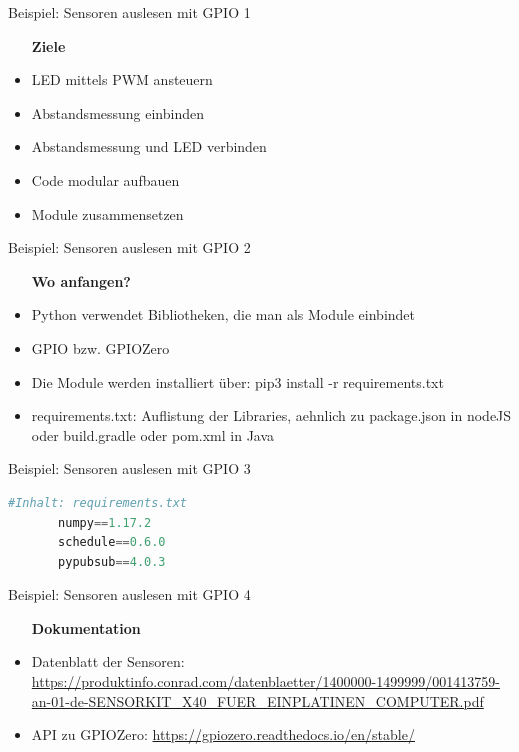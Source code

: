 \begin{frame}{Beispiel: Sensoren auslesen mit GPIO 1}
    \begin{itemize}
    \setlength{\itemindent}{.4in}
     \item [\textbf{ Ziele}]
    \end{itemize}
    \begin{itemize}
        \item  LED mittels PWM ansteuern
        \item  Abstandsmessung einbinden
        \item  Abstandsmessung und LED verbinden
        \item  Code modular aufbauen
        \item  Module zusammensetzen
     \end{itemize}
\end{frame}

\begin{frame}{Beispiel: Sensoren auslesen mit GPIO 2}
    \begin{itemize}
    \setlength{\itemindent}{1in}
     \item [\textbf{ Wo anfangen?}]
    \end{itemize}
    \begin{itemize}
        \item  Python verwendet Bibliotheken, die man als Module einbindet
        \item  GPIO bzw. GPIOZero
        \item  Die Module werden installiert über:  pip3 install -r requirements.txt
        \item  requirements.txt: Auflistung der Libraries, aehnlich zu package.json in nodeJS oder build.gradle oder pom.xml in Java
     \end{itemize}
\end{frame}

\begin{frame}[fragile]{Beispiel: Sensoren auslesen mit GPIO 3}
     \begin{lstlisting}[language=Python]
     #Inhalt: requirements.txt
       numpy==1.17.2
       schedule==0.6.0
       pypubsub==4.0.3
     \end{lstlisting}
\end{frame}

\begin{frame}{Beispiel: Sensoren auslesen mit GPIO 4}
    \begin{itemize}
    \setlength{\itemindent}{1.0in}
     \item [\textbf{ Dokumentation}]
    \end{itemize}

    \begin{itemize}
        \item  Datenblatt der Sensoren: \url{https://produktinfo.conrad.com/datenblaetter/1400000-1499999/001413759-an-01-de-SENSORKIT_X40_FUER_EINPLATINEN_COMPUTER.pdf}
        \item  API zu GPIOZero: \url{https://gpiozero.readthedocs.io/en/stable/}
     \end{itemize}
\end{frame}


